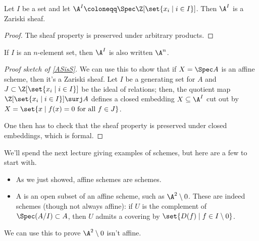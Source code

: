 \begin{cor}
Let $I$ be a set and let $\A^I\coloneqq\Spec\Z[\set{x_i\mid i\in I}]$. Then $\A^I$ is a Zariski sheaf.
\end{cor}
\begin{proof}
The sheaf property is preserved under arbitrary products.
\end{proof}
If $I$ is an $n$-element set, then $\A^I$ is also written $\A^n$.
\begin{proof}[Proof sketch of \cref{ASisS}]
We can use this to show that if $X = \Spec A$ is an affine scheme, then it's a Zariski sheaf. Let $I$ be a
generating set for $A$ and $J \subset\Z[\set{x_i\mid i\in I}]$ be the ideal of relations; then, the quotient map
$\Z[\set{x_i\mid i\in I}]\surj A$ defines a closed embedding $X\subseteq \A^I$ cut out by $X = \set{x\mid f(x) =
0\text{ for all } f\in J}$.

One then has to check that the sheaf property is preserved under closed embeddings, which is formal.
\end{proof}
We'll spend the next lecture giving examples of schemes, but here are a few to start with.
\begin{itemize}
	\item As we just showed, affine schemes are schemes.
	\item A  is an open subset of an affine scheme, such as $\A^2\setminus 0$. These are
	indeed schemes (though not always affine): if $U$ is the complement of $\Spec (A/I)\subset A$, then $U$ admits
	a covering by $\set{D(f)\mid f\in I\setminus 0}$.
\end{itemize}
We can use this to prove $\A^2\setminus 0$ isn't affine.

